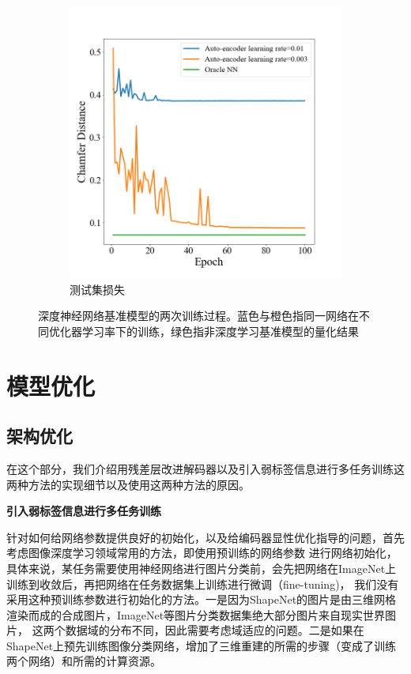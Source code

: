 \documentclass[bachelor, nocolorlinks, printoneside]{seuthesis} %
\begin{document}
\begin{Main}
\begin{figure}[!htb]
\begin{subfigure}[t]{0.49\linewidth}
          \includegraphics[width=\columnwidth]{figs//model/ae_testloss.png}
          \caption{测试集损失}\label{fig:testloss}
      \end{subfigure}
       \caption{\small 深度神经网络基准模型的两次训练过程。蓝色与橙色指同一网络在不同优化器学习率下的训练，绿色指非深度学习基准模型的量化结果}
    \label{fig:lossplot}
\end{figure}

\FloatBarrier
\section{模型优化}
\subsection{架构优化}\label{sec:optimal_method}
在这个部分，我们介绍用残差层改进解码器以及引入弱标签信息进行多任务训练这两种方法的实现细节以及使用这两种方法的原因。

\noindent
\textbf{引入弱标签信息进行多任务训练}

针对如何给网络参数提供良好的初始化，以及给编码器显性优化指导的问题，首先考虑图像深度学习领域常用的方法，即使用预训练的网络参数
进行网络初始化，具体来说，某任务需要使用神经网络进行图片分类前，会先把网络在ImageNet上训练到收敛后，再把网络在任务数据集上训练进行微调（fine-tuning)，
我们没有采用这种预训练参数进行初始化的方法。一是因为ShapeNet的图片是由三维网格渲染而成的合成图片，ImageNet等图片分类数据集绝大部分图片来自现实世界图片，
这两个数据域的分布不同，因此需要考虑域适应的问题。二是如果在ShapeNet上预先训练图像分类网络，增加了三维重建的所需的步骤（变成了训练两个网络）和所需的计算资源。


\end{Main}
\end{document}
